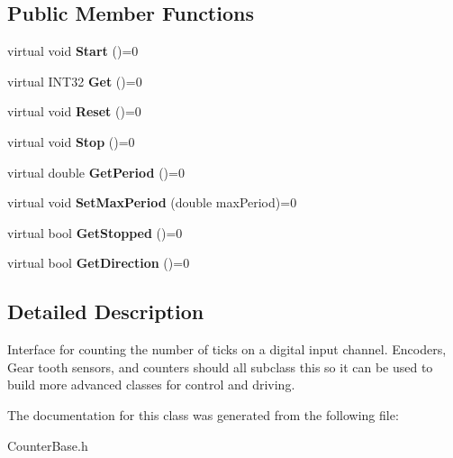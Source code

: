 \subsection*{Public Member Functions}
\begin{DoxyCompactItemize}
\item 
\hypertarget{classCounterBase_ac8c376e198e0402fd46712e323475302}{
virtual void {\bfseries Start} ()=0}
\label{classCounterBase_ac8c376e198e0402fd46712e323475302}

\item 
\hypertarget{classCounterBase_a38288a46837b813ac2e34c07cc4d069c}{
virtual INT32 {\bfseries Get} ()=0}
\label{classCounterBase_a38288a46837b813ac2e34c07cc4d069c}

\item 
\hypertarget{classCounterBase_afa72871043355ad39e703cfd182aec20}{
virtual void {\bfseries Reset} ()=0}
\label{classCounterBase_afa72871043355ad39e703cfd182aec20}

\item 
\hypertarget{classCounterBase_aea8ddd4a23c5d0fc05164a9b55fb22f8}{
virtual void {\bfseries Stop} ()=0}
\label{classCounterBase_aea8ddd4a23c5d0fc05164a9b55fb22f8}

\item 
\hypertarget{classCounterBase_a1d011fe2873cdf4a0fe624a56f38485b}{
virtual double {\bfseries GetPeriod} ()=0}
\label{classCounterBase_a1d011fe2873cdf4a0fe624a56f38485b}

\item 
\hypertarget{classCounterBase_aecc60bf699c067a61dc6abd6c077d3dc}{
virtual void {\bfseries SetMaxPeriod} (double maxPeriod)=0}
\label{classCounterBase_aecc60bf699c067a61dc6abd6c077d3dc}

\item 
\hypertarget{classCounterBase_a47e66b67064bad970d353918474fc434}{
virtual bool {\bfseries GetStopped} ()=0}
\label{classCounterBase_a47e66b67064bad970d353918474fc434}

\item 
\hypertarget{classCounterBase_a88b315c3e1d4e2f4431d6455c4e4173d}{
virtual bool {\bfseries GetDirection} ()=0}
\label{classCounterBase_a88b315c3e1d4e2f4431d6455c4e4173d}

\end{DoxyCompactItemize}


\subsection{Detailed Description}
Interface for counting the number of ticks on a digital input channel. Encoders, Gear tooth sensors, and counters should all subclass this so it can be used to build more advanced classes for control and driving. 

The documentation for this class was generated from the following file:\begin{DoxyCompactItemize}
\item 
CounterBase.h\end{DoxyCompactItemize}

